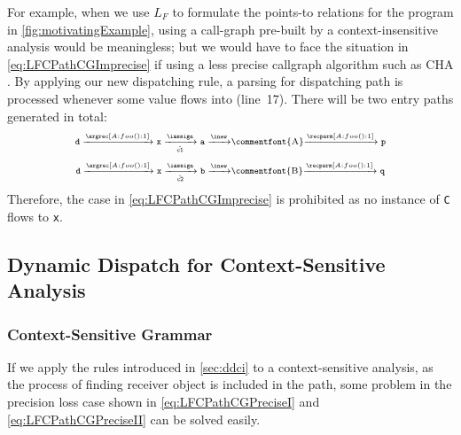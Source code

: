 For example, when we use $L_F$ to formulate the points-to relations for the program in \cref{fig:motivatingExample}, using a call-graph pre-built by a context-insensitive analysis would be meaningless; but we would have to face the situation in \cref{eq:LFCPathCGImprecise} if using a less precise callgraph algorithm such as CHA \cite{dean1995optimization}. By applying our new dispatching rule, a parsing for dispatching path is processed whenever some value flows into  (line~17). There will be two entry paths generated in total:
\begin{equation}
  \centering
\label{eq:ParmPathI}
\begin{tabular}{l} \scriptsize
$\texttt{d}\xrightarrow{\argrec[A:foo():1]}\texttt{x}
\xrightarrow[\check{\mathtt{c1}}]{\iassign}\texttt{a}
\xrightarrow{\inew}$\commentfont{A}$\xrightarrow{\recparm[A:foo():1]}\texttt{p}$
\end{tabular}
\end{equation}
\begin{equation}
  \centering
\label{eq:ParmPathII}
\begin{tabular}{l} \scriptsize
$\texttt{d}\xrightarrow{\argrec[A:foo():1]}\texttt{x}
\xrightarrow[\check{\mathtt{c2}}]{\iassign}\texttt{b}
\xrightarrow{\inew}$\commentfont{B}$\xrightarrow{\recparm[A:foo():1]}\texttt{q}$
\end{tabular}
\end{equation}
Therefore, the case in \cref{eq:LFCPathCGImprecise} is prohibited as no instance of \texttt{C} flows to \texttt{x}.

\subsection{Dynamic Dispatch for Context-Sensitive Analysis}
\subsubsection{Context-Sensitive Grammar}
If we apply the rules introduced in \cref{sec:ddci} to a context-sensitive analysis, as the process of finding receiver object is included in the path, some problem in the precision loss case shown in \cref{eq:LFCPathCGPreciseI} and \cref{eq:LFCPathCGPreciseII} can be solved easily.

